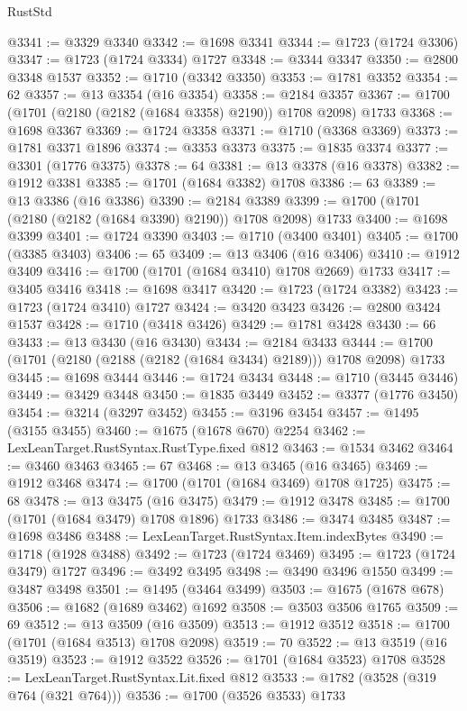 \begin{lexlean}{RustStd}
\begin{coremodule}
@3341 := @3329 @3340
@3342 := @1698 @3341
@3344 := @1723 (@1724 @3306)
@3347 := @1723 (@1724 @3334) @1727
@3348 := @3344 @3347
@3350 := @2800 @3348 @1537
@3352 := @1710 (@3342 @3350)
@3353 := @1781 @3352
@3354 := 62
@3357 := @13 @3354 (@16 @3354)
@3358 := @2184 @3357
@3367 := @1700 (@1701 (@2180 (@2182 (@1684 @3358) @2190)) @1708 @2098) @1733
@3368 := @1698 @3367
@3369 := @1724 @3358
@3371 := @1710 (@3368 @3369)
@3373 := @1781 @3371 @1896
@3374 := @3353 @3373
@3375 := @1835 @3374
@3377 := @3301 (@1776 @3375)
@3378 := 64
@3381 := @13 @3378 (@16 @3378)
@3382 := @1912 @3381
@3385 := @1701 (@1684 @3382) @1708
@3386 := 63
@3389 := @13 @3386 (@16 @3386)
@3390 := @2184 @3389
@3399 := @1700 (@1701 (@2180 (@2182 (@1684 @3390) @2190)) @1708 @2098) @1733
@3400 := @1698 @3399
@3401 := @1724 @3390
@3403 := @1710 (@3400 @3401)
@3405 := @1700 (@3385 @3403)
@3406 := 65
@3409 := @13 @3406 (@16 @3406)
@3410 := @1912 @3409
@3416 := @1700 (@1701 (@1684 @3410) @1708 @2669) @1733
@3417 := @3405 @3416
@3418 := @1698 @3417
@3420 := @1723 (@1724 @3382)
@3423 := @1723 (@1724 @3410) @1727
@3424 := @3420 @3423
@3426 := @2800 @3424 @1537
@3428 := @1710 (@3418 @3426)
@3429 := @1781 @3428
@3430 := 66
@3433 := @13 @3430 (@16 @3430)
@3434 := @2184 @3433
@3444 := @1700 (@1701 (@2180 (@2188 (@2182 (@1684 @3434) @2189))) @1708 @2098) @1733
@3445 := @1698 @3444
@3446 := @1724 @3434
@3448 := @1710 (@3445 @3446)
@3449 := @3429 @3448
@3450 := @1835 @3449
@3452 := @3377 (@1776 @3450)
@3454 := @3214 (@3297 @3452)
@3455 := @3196 @3454
@3457 := @1495 (@3155 @3455)
@3460 := @1675 (@1678 @670) @2254
@3462 := LexLeanTarget.RustSyntax.RustType.fixed @812
@3463 := @1534 @3462
@3464 := @3460 @3463
@3465 := 67
@3468 := @13 @3465 (@16 @3465)
@3469 := @1912 @3468
@3474 := @1700 (@1701 (@1684 @3469) @1708 @1725)
@3475 := 68
@3478 := @13 @3475 (@16 @3475)
@3479 := @1912 @3478
@3485 := @1700 (@1701 (@1684 @3479) @1708 @1896) @1733
@3486 := @3474 @3485
@3487 := @1698 @3486
@3488 := LexLeanTarget.RustSyntax.Item.indexBytes
@3490 := @1718 (@1928 @3488)
@3492 := @1723 (@1724 @3469)
@3495 := @1723 (@1724 @3479) @1727
@3496 := @3492 @3495
@3498 := @3490 @3496 @1550
@3499 := @3487 @3498
@3501 := @1495 (@3464 @3499)
@3503 := @1675 (@1678 @678)
@3506 := @1682 (@1689 @3462) @1692
@3508 := @3503 @3506 @1765
@3509 := 69
@3512 := @13 @3509 (@16 @3509)
@3513 := @1912 @3512
@3518 := @1700 (@1701 (@1684 @3513) @1708 @2098)
@3519 := 70
@3522 := @13 @3519 (@16 @3519)
@3523 := @1912 @3522
@3526 := @1701 (@1684 @3523) @1708
@3528 := LexLeanTarget.RustSyntax.Lit.fixed @812
@3533 := @1782 (@3528 (@319 @764 (@321 @764)))
@3536 := @1700 (@3526 @3533) @1733

\end{coremodule}
\end{lexlean}
